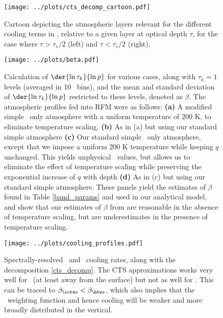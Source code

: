 \documentclass[10pt]{article}
\newcommand{\tauk}{\ensuremath{\tau_k}}
\newcommand{\taus}{\ensuremath{\tau_s}}
\begin{document}
\begin{figure}[h!]
	\begin{center}
			\texttt{[image: ../plots/cts\_decomp\_cartoon.pdf]}
		\caption{Cartoon depicting the atmospheric layers relevant for the different cooling terms in , relative to a given layer at optical depth $\tau$, for the case where $\tau > \taus/2$ (left) and $\tau<\taus/2$ (right).
		\label{cts_decomp_cartoon}
		}
	\end{center}
\end{figure}

\begin{figure}[h!]
	\begin{center}
			\texttt{[image: ../plots/beta.pdf]}
		\caption{Calculation of $\der{\ln \tauk}{\ln p}$ for various cases, along with $\tauk=1$ levels (averaged in 10 \cminverse\ bins), and the mean and standard deviation of $\der{\ln \tauk}{\ln p}$ restricted to these levels, denoted as $\beta$. The atmospheric profiles fed into RFM were as follows:
					\textbf{(a)}  A modified simple \cotwo\ only atmosphere  with a uniform temperature of 200 K, to eliminate temperature scaling.
					\textbf{(b)}  As in (a) but using our standard simple atmosphere
					\textbf{(c)}  Our  standard simple \htwo\ only atmosphere, except that we impose a uniform 200 K temperature while keeping $q$ unchanged. This yields unphysical \RH\ values, but allows us to eliminate the effect of temperature scaling while preserving the exponential increase of $q$ with depth  
					\textbf{(d)}   As in (c) but using our standard simple atmosphere.
					These panels yield the estimates of $\beta$ found in Table \ref{band_params} and used in our analytical model, and show that our estimates of $\beta$ from  are reasonable in the absence of temperature scaling, but are underestimates in the presence of temperature scaling.
		\label{beta}
		}
	\end{center}
\end{figure}

\begin{figure}[h]
	\begin{center}
			\texttt{[image: ../plots/cooling\_profiles.pdf]}
		\caption{Spectrally-resolved \htwo\  and \cotwo\ cooling rates, along with the decomposition \eqref{cts_decomp}. The CTS approximations works very well for \htwo\ (at least away from the surface) but not as well for \cotwo. This can be traced to $\beta_{\cotwo} < \beta_{\htwo}$, which also implies that the \cotwo\ weighting function and hence cooling will be weaker and more broadly distributed in the vertical.
		\label{cooling_profiles}
		}
	\end{center}
\end{figure}






\pagebreak



\end{document}

